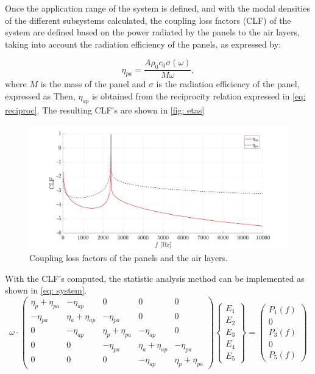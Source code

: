 Once the application range of the system is defined, and with the modal densities of the different subsystems calculated, the coupling loss factors (CLF) of the system are defined based on the power radiated by the panels to the air layers, taking into account the radiation efficiency of the panels, as expressed by:

\begin{equation}
\eta_{p a}=\frac{A \rho_0 c_0 \sigma(\omega)}{M \omega},
\end{equation}
where $M$ is the mass of the panel and $\sigma$ is the radiation efficiency of the panel, expressed as
Then, $\eta_{ap}$ is obtained from the reciprocity relation expressed in \autoref{eq: reciproc}. The resulting CLF's are shown in \autoref{fig: etas}

\begin{figure}[H]
    \centering
    \includegraphics[width=0.75\linewidth]{Figures/etas.png}
    \caption{Coupling loss factors of the panels and the air layers.}
    \label{fig: etas}
\end{figure}

With the CLF's computed, the statistic analysis method can be implemented as shown in \autoref{eq: system}.
\begin{equation}
    \label{eq: system}
    \omega \cdot\left(\begin{array}{ccccc}
    \eta_p+\eta_{p a} & -\eta_{a p} & 0 & 0 & 0 \\
    -\eta_{p a} & \eta_a+\eta_{a p} & -\eta_{p a} & 0 & 0 \\
    0 & -\eta_{a p} & \eta_p+\eta_{p a} & -\eta_{a p} & 0 \\
    0 & 0 & -\eta_{p a} & \eta_a+\eta_{a p} & -\eta_{p a} \\
    0 & 0 & 0 & -\eta_{a p} & \eta_p+\eta_{p a}
    \end{array}\right)\left\{\begin{array}{c}
    E_1 \\
    E_2 \\
    E_3 \\
    E_4 \\
    E_5
    \end{array}\right\}=\left(\begin{array}{c}
    P_1(f) \\
    0 \\
    P_3(f) \\
    0 \\
    P_5(f)
    \end{array}\right)
\end{equation}

